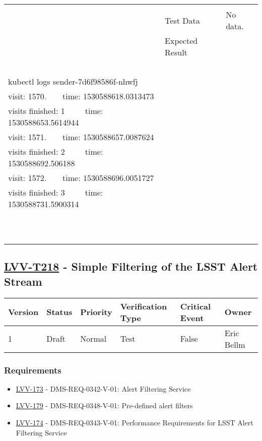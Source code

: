 \begin{longtable}[]{p{1.3cm}p{2cm}p{13cm}}
\begin{minipage}[t]{13cm}
{\vspace{\dp0}
} \end{minipage} \\ \cline{2-3}
& Test Data &
\begin{minipage}[t]{13cm}{\footnotesize
No data.
\vspace{\dp0}
} \end{minipage} \\ \cline{2-3}
& Expected Result &
\begin{minipage}[t]{13cm}{\footnotesize
Similar to\\
~\\
kubectl logs sender-7d6f98586f-nhwfj\\
visit: 1570. ~ ~ time: 1530588618.0313473\\
visits finished: 1 ~ ~ ~time: 1530588653.5614944\\
visit: 1571. ~ ~ time: 1530588657.0087624\\
visits finished: 2 ~ ~ ~time: 1530588692.506188\\
visit: 1572. ~ ~ time: 1530588696.0051727\\
visits finished: 3 ~ ~ ~time: 1530588731.5900314\\
~\\
~\\

\vspace{\dp0}
} \end{minipage}
\\ \midrule
\end{longtable}

\subsection{\href{https://jira.lsstcorp.org/secure/Tests.jspa\#/testCase/LVV-T218}{LVV-T218}
    - Simple Filtering of the LSST Alert Stream}\label{lvv-t218}

\begin{longtable}[]{llllll}
\toprule
Version & Status & Priority & Verification Type & Critical Event & Owner
\\\midrule
1 & Draft & Normal &
Test & False & Eric Bellm
\\\bottomrule
\end{longtable}

\subsubsection{Requirements}
\begin{itemize}
\item \href{https://jira.lsstcorp.org/browse/LVV-173}{LVV-173} - DMS-REQ-0342-V-01: Alert Filtering Service
\item \href{https://jira.lsstcorp.org/browse/LVV-179}{LVV-179} - DMS-REQ-0348-V-01: Pre-defined alert filters
\item \href{https://jira.lsstcorp.org/browse/LVV-174}{LVV-174} - DMS-REQ-0343-V-01: Performance Requirements for LSST Alert Filtering Service
\end{itemize}

